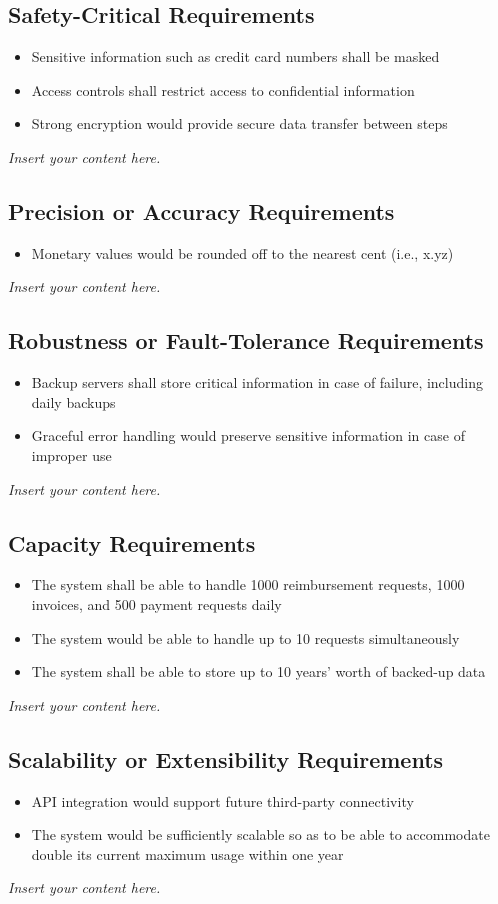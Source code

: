 \documentclass[12pt]{article}
\newcommand{\lips}{\textit{Insert your content here.}}
\begin{document}
\subsection{Safety-Critical Requirements}
\begin{itemize}
    \item Sensitive information such as credit card numbers shall be masked
    \item Access controls shall restrict access to confidential information
    \item Strong encryption would provide secure data transfer between steps
\end{itemize}
\lips
\subsection{Precision or Accuracy Requirements}
\begin{itemize}
    \item Monetary values would be rounded off to the nearest cent (i.e., x.yz)
\end{itemize}
\lips
\subsection{Robustness or Fault-Tolerance Requirements}
\begin{itemize}
    \item Backup servers shall store critical information in case of failure, including daily backups
    \item Graceful error handling would preserve sensitive information in case of improper use
\end{itemize}
\lips
\subsection{Capacity Requirements}
\begin{itemize}
    \item The system shall be able to handle 1000 reimbursement requests, 1000 invoices, and 500 payment requests daily
    \item The system would be able to handle up to 10 requests simultaneously
    \item The system shall be able to store up to 10 years’ worth of backed-up data
\end{itemize}
\lips
\subsection{Scalability or Extensibility Requirements}
\begin{itemize}
    \item API integration would support future third-party connectivity
    \item The system would be sufficiently scalable so as to be able to accommodate double its current maximum usage within one year
\end{itemize}
\lips
\end{document}
